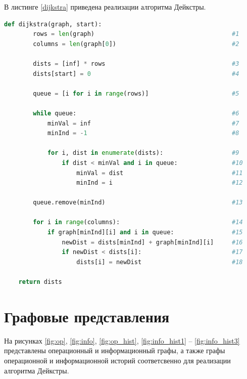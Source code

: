 \documentclass[a4paper,14pt, unknownkeysallowed]{extreport}
\begin{document}
В листинге \ref{dijkstra} приведена реализации алгоритма Дейкстры.

\begin{lstlisting}[label= time,caption=Функции замеров процессорного времени,language=python]
    def dijkstra(graph, start):
        rows = len(graph)                                      #1
        columns = len(graph[0])                                #2

        dists = [inf] * rows                                   #3
        dists[start] = 0                                       #4 

        queue = [i for i in range(rows)]                       #5

        while queue:                                           #6
            minVal = inf                                       #7
            minInd = -1                                        #8

            for i, dist in enumerate(dists):                   #9
                if dist < minVal and i in queue:               #10
                    minVal = dist                              #11
                    minInd = i                                 #12

        queue.remove(minInd)                                   #13

        for i in range(columns):                               #14
            if graph[minInd][i] and i in queue:                #15
                newDist = dists[minInd] + graph[minInd][i]     #16
                if newDist < dists[i]:                         #17
                    dists[i] = newDist                         #18

    return dists

\end{lstlisting}
 
\section{Графовые представления}
		
На рисунках \ref{fig:op}, \ref{fig:info}, \ref{fig:op_hist}, \ref{fig:info_hist1} -- \ref{fig:info_hist3} представлены операционный и информационный графы, а также графы операционной и информационной историй соответсвенно для реализации алгоритма Дейкстры.
\end{document}
